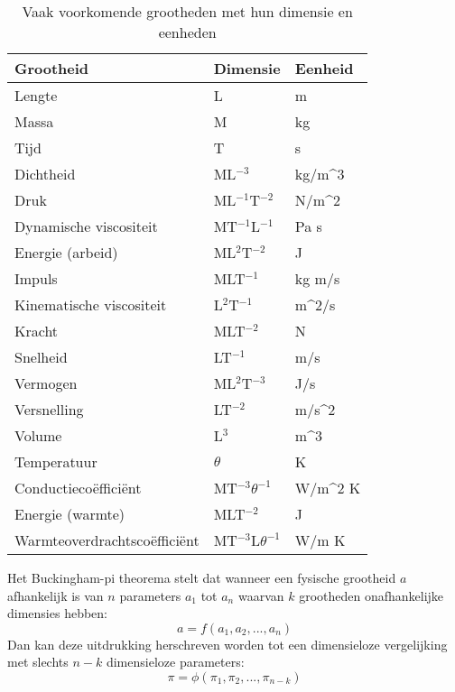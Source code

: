 \begin{table}[htb]
	\centering
	\begin{tabular}{lll}
		\hline
		Grootheid      & Dimensie   & Eenheid \\
		\hline
		Lengte & L &  \unit{}{m} \\
		Massa   & M &   \unit{}{kg} \\
		Tijd    & T &   \unit{}{s} \\
		Dichtheid    & ML$^{-3}$    &   \unit{}{kg/m^3} \\
		Druk    & ML$^{-1}$T$^{-2}$    &   \unit{}{N/m^2} \\	
		Dynamische viscositeit    & MT$^{-1}$L$^{-1}$    &   \unit{}{Pa s} \\
		Energie (arbeid)    & ML$^{2}$T$^{-2}$    &   \unit{}{J} \\
		Impuls    & MLT$^{-1}$    &   \unit{}{kg m/s} \\
		Kinematische viscositeit    & L$^{2}$T$^{-1}$    &   \unit{}{m^2/s} \\
		Kracht    & MLT$^{-2}$    &   \unit{}{N} \\
		Snelheid    & LT$^{-1}$    &   \unit{}{m/s} \\
		Vermogen    & ML$^{2}$T$^{-3}$    &   \unit{}{J/s} \\
		Versnelling    & LT$^{-2}$    &   \unit{}{m/s^2} \\
		Volume    & L$^3$   &   \unit{}{m^3} \\
		Temperatuur    & $\theta$    &   \unit{}{K} \\
		Conductieco\"effici\"ent  &MT$^{-3}$$\theta^{-1}$    &   \unit{}{W/m^2 K} \\	
		Energie (warmte)    & MLT$^{-2}$    &   \unit{}{J} \\
		Warmteoverdrachtsco\"effici\"ent & MT$^{-3}$L$\theta^{-1}$    &   \unit{}{W/m K} \\
		\hline
	\end{tabular}
	\caption{Vaak voorkomende grootheden met hun dimensie en eenheden}
	\label{tab:grootheden}
\end{table}
\npar
Het Buckingham-pi theorema stelt dat wanneer een fysische grootheid $a$ afhankelijk is van $n$ parameters $a_1$ tot $a_n$ waarvan $k$ grootheden onafhankelijke dimensies hebben:
\begin{equation}
	a = f(a_1,a_2,...,a_n)
\end{equation}
Dan kan deze uitdrukking herschreven worden tot een dimensieloze vergelijking met slechts $n-k$ dimensieloze parameters:
\begin{equation}
	\pi = \phi(\pi_1,\pi_2,...,\pi_{n-k})
\end{equation}
